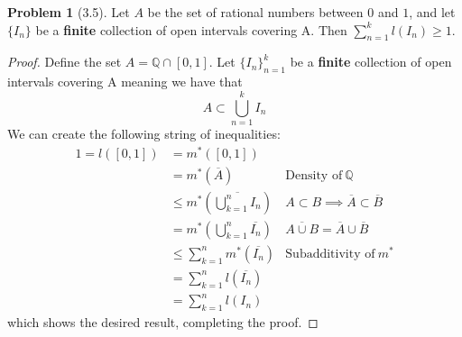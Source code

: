 \documentclass[12pt]{article}
\newcommand{\Q}{\mathbb{Q}}
\theoremstyle{definition}
\newtheorem{problem}{Problem}
\begin{document}
\begin{problem}[3.5]

    Let \( A \) be the set of rational numbers between \( 0 \) and \( 1 \), and let \( \{ I_n \} \) be a \textbf{finite} collection of open intervals covering A. Then \( \displaystyle \sum_{n=1}^{k} l(I_n) \geq 1 \).

        \begin{proof}
            Define the set \( A = \Q \cap [0, 1] \). Let \( \{ I_n \}_{n=1}^{k} \) be a \textbf{finite} collection of open intervals covering A meaning we have that 
                \[
                    A \subset \bigcup_{n=1}^{k} I_n
                \]
            We can create the following string of inequalities:
                \begin{align*}
                    1 = l([0, 1]) &= m^{*}([0, 1]) \\
                                  &= m^{*}\left( \overline{A} \right) & \text{Density of} \ \Q \\
                                  &\leq m^{*} \left( \overline{\bigcup_{k=1}^{n} I_n}\right) & A \subset B \implies \overline{A} \subset \overline{B} \\
                                  &= m^{*} \left( \bigcup_{k=1}^{n} \overline{I_n} \right) & \overline{A \cup B} = \overline{A} \cup \overline{B} \\
                                  &\leq \sum_{k=1}^{n} m^{*}\left( \overline{I_{n}}\right) & \text{Subadditivity of} \ m^{*} \\
                                  &= \sum_{k=1}^{n} l\left( \overline{I_n} \right) \\
                                  &= \sum_{k=1}^{n} l(I_n)
                \end{align*}
            which shows the desired result, completing the proof.
        \end{proof}
     
\end{problem}
\end{document}
